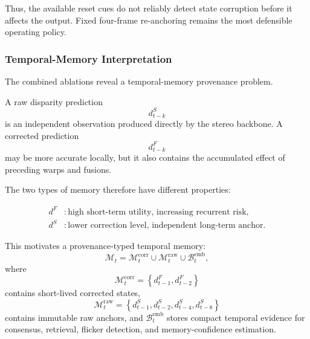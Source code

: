 \documentclass[11pt,a4paper]{article}
\begin{document}
Thus, the available reset cues do not reliably detect state corruption before it affects
the output. Fixed four-frame re-anchoring remains the most defensible operating policy.

\subsubsection{Temporal-Memory Interpretation}

The combined ablations reveal a temporal-memory provenance problem.

A raw disparity prediction
\begin{equation}
    d_{t-k}^{S}
\end{equation}
is an independent observation produced directly by the stereo backbone. A corrected
prediction
\begin{equation}
    d_{t-k}^{F}
\end{equation}
may be more accurate locally, but it also contains the accumulated effect of preceding
warps and fusions.

The two types of memory therefore have different properties:

\begin{align}
    d^{F}
    &: \text{high short-term utility, increasing recurrent risk},\\
    d^{S}
    &: \text{lower correction level, independent long-term anchor}.
\end{align}

This motivates a provenance-typed temporal memory:
\begin{equation}
    \mathcal{M}_t
    =
    \mathcal{M}^{\mathrm{corr}}_t
    \cup
    \mathcal{M}^{\mathrm{raw}}_t
    \cup
    \mathcal{B}^{\mathrm{emb}}_t,
    \label{eq:hybrid_temporal_memory}
\end{equation}
where
\begin{equation}
    \mathcal{M}^{\mathrm{corr}}_t
    =
    \left\{
        d_{t-1}^{F},
        d_{t-2}^{F}
    \right\}
\end{equation}
contains short-lived corrected states,
\begin{equation}
    \mathcal{M}^{\mathrm{raw}}_t
    =
    \left\{
        d_{t-1}^{S},
        d_{t-2}^{S},
        d_{t-4}^{S},
        d_{t-8}^{S}
    \right\}
\end{equation}
contains immutable raw anchors, and
\(\mathcal{B}^{\mathrm{emb}}_t\) stores compact temporal evidence for consensus,
retrieval, flicker detection, and memory-confidence estimation.
\end{document}
